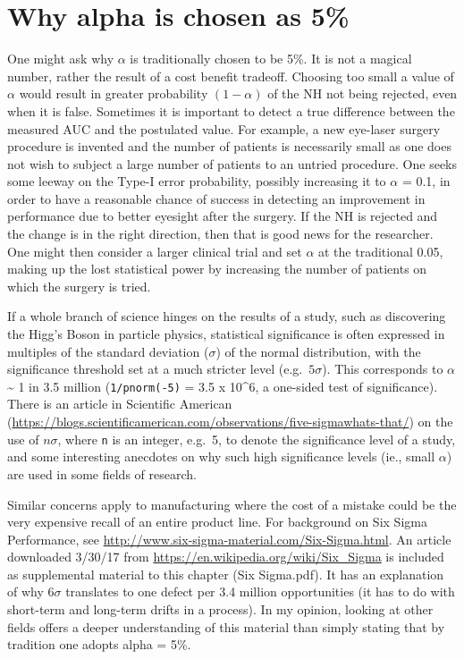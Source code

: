 \documentclass[
]{book}
\begin{document}
\hypertarget{why-alpha-is-chosen-as-5}{%
\section{Why alpha is chosen as 5\%}\label{why-alpha-is-chosen-as-5}}

One might ask why \(\alpha\) is traditionally chosen to be 5\%. It is not a magical number, rather the result of a cost benefit tradeoff. Choosing too small a value of \(\alpha\) would result in greater probability \((1-\alpha)\) of the NH not being rejected, even when it is false. Sometimes it is important to detect a true difference between the measured AUC and the postulated value. For example, a new eye-laser surgery procedure is invented and the number of patients is necessarily small as one does not wish to subject a large number of patients to an untried procedure. One seeks some leeway on the Type-I error probability, possibly increasing it to \(\alpha\) = 0.1, in order to have a reasonable chance of success in detecting an improvement in performance due to better eyesight after the surgery. If the NH is rejected and the change is in the right direction, then that is good news for the researcher. One might then consider a larger clinical trial and set \(\alpha\) at the traditional 0.05, making up the lost statistical power by increasing the number of patients on which the surgery is tried.

If a whole branch of science hinges on the results of a study, such as discovering the Higg's Boson in particle physics, statistical significance is often expressed in multiples of the standard deviation (\(\sigma\)) of the normal distribution, with the significance threshold set at a much stricter level (e.g.~\(5\sigma\)). This corresponds to \(\alpha\) \textasciitilde{} 1 in 3.5 million (\texttt{1/pnorm(-5)} = 3.5 x 10\^{}6, a one-sided test of significance). There is an article in Scientific American (\url{https://blogs.scientificamerican.com/observations/five-sigmawhats-that/}) on the use of \(n\sigma\), where \texttt{n} is an integer, e.g.~5, to denote the significance level of a study, and some interesting anecdotes on why such high significance levels (ie., small \(\alpha\)) are used in some fields of research.

Similar concerns apply to manufacturing where the cost of a mistake could be the very expensive recall of an entire product line. For background on Six Sigma Performance, see \url{http://www.six-sigma-material.com/Six-Sigma.html}. An article downloaded 3/30/17 from \url{https://en.wikipedia.org/wiki/Six_Sigma} is included as supplemental material to this chapter (Six Sigma.pdf). It has an explanation of why \(6\sigma\) translates to one defect per 3.4 million opportunities (it has to do with short-term and long-term drifts in a process). In my opinion, looking at other fields offers a deeper understanding of this material than simply stating that by tradition one adopts alpha = 5\%.
\end{document}
